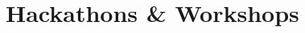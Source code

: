 \documentclass[a4paper,10pt]{extarticle} %
\begin{document}
\begin{tabular}{r|p{17.5cm}}
\end{tabular}

\vspace{-0.3cm}
\section{Hackathons \& Workshops}
\end{document}

